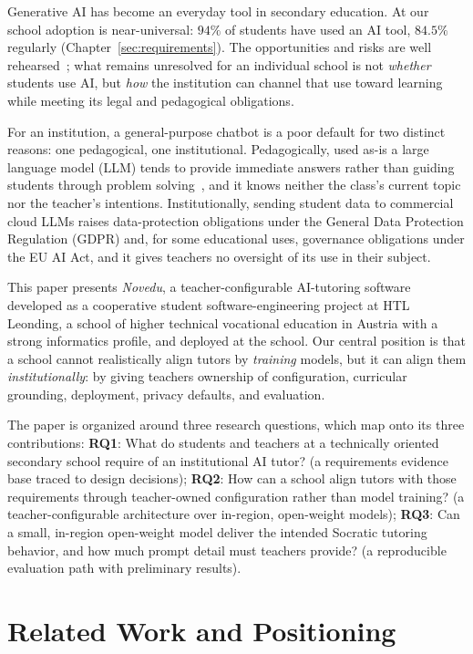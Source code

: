 \documentclass[runningheads]{llncs}
\begin{document}
Generative AI has become an everyday tool in secondary education. At our school adoption is near-universal: $94\%$ of students have used an AI tool, $84.5\%$ regularly (Chapter~\ref{sec:requirements}). The opportunities and risks are well rehearsed~\cite{kasneci2023chatgpt}; what remains unresolved for an individual school is not \emph{whether} students use AI, but \emph{how} the institution can channel that use toward learning while meeting its legal and pedagogical obligations.

For an institution, a general-purpose chatbot is a poor default for two distinct reasons: one pedagogical, one institutional. Pedagogically, used as-is a large language model (LLM) tends to provide immediate answers rather than guiding students through problem solving~\cite{sonkar2024pedagogical}, and it knows neither the class's current topic nor the teacher's intentions. Institutionally, sending student data to commercial cloud LLMs raises data-protection obligations under the General Data Protection Regulation (GDPR) and, for some educational uses, governance obligations under the EU AI Act, and it gives teachers no oversight of its use in their subject.

This paper presents \emph{Novedu}, a teacher-configurable AI-tutoring software developed as a cooperative student software-engineering project at HTL Leonding, a school of higher technical vocational education in Austria with a strong informatics profile, and deployed at the school. Our central position is that a school cannot realistically align tutors by \emph{training} models, but it can align them \emph{institutionally}: by giving teachers ownership of configuration, curricular grounding, deployment, privacy defaults, and evaluation.

The paper is organized around three research questions, which map onto its three contributions: \textbf{RQ1}: What do students and teachers at a technically oriented secondary school require of an institutional AI tutor? (a requirements evidence base traced to design decisions); \textbf{RQ2}: How can a school align tutors with those requirements through teacher-owned configuration rather than model training? (a teacher-configurable architecture over in-region, open-weight models); \textbf{RQ3}: Can a small, in-region open-weight model deliver the intended Socratic tutoring behavior, and how much prompt detail must teachers provide? (a reproducible evaluation path with preliminary results).

\section{Related Work and Positioning}
\label{sec:related}
\end{document}
